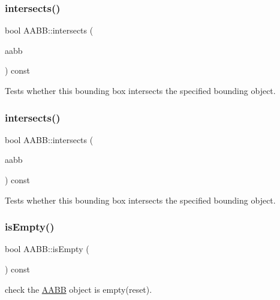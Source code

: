 \subsubsection{\texorpdfstring{intersects()}{intersects()}\hspace{0.1cm}{\footnotesize\ttfamily [1/2]}}
{\footnotesize\ttfamily bool A\+A\+B\+B\+::intersects (\begin{DoxyParamCaption}\item[{const \hyperlink{classAABB}{A\+A\+BB} \&}]{aabb }\end{DoxyParamCaption}) const}

Tests whether this bounding box intersects the specified bounding object. \mbox{\label{classAABB_abc1e3b1f4eccf3f2e3c7683a92b8bda3}} 
\subsubsection{\texorpdfstring{intersects()}{intersects()}\hspace{0.1cm}{\footnotesize\ttfamily [2/2]}}
{\footnotesize\ttfamily bool A\+A\+B\+B\+::intersects (\begin{DoxyParamCaption}\item[{const \hyperlink{classAABB}{A\+A\+BB} \&}]{aabb }\end{DoxyParamCaption}) const}

Tests whether this bounding box intersects the specified bounding object. \mbox{\label{classAABB_a477f106679bcd7dd24c3836bb242e542}} 
\subsubsection{\texorpdfstring{is\+Empty()}{isEmpty()}\hspace{0.1cm}{\footnotesize\ttfamily [1/2]}}
{\footnotesize\ttfamily bool A\+A\+B\+B\+::is\+Empty (\begin{DoxyParamCaption}{ }\end{DoxyParamCaption}) const}

check the \hyperlink{classAABB}{A\+A\+BB} object is empty(reset). \mbox{\label{classAABB_a477f106679bcd7dd24c3836bb242e542}} 
